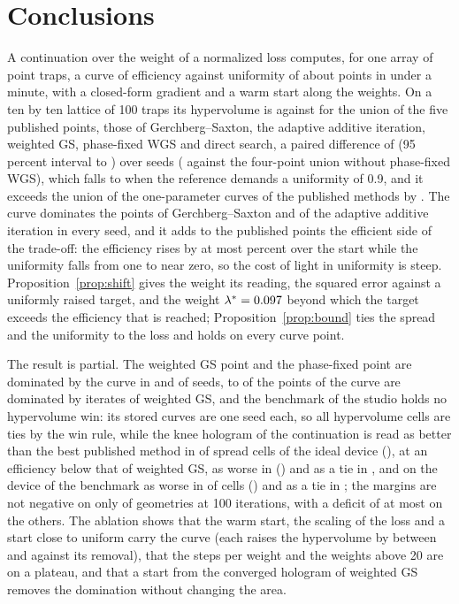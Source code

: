 \section{Conclusions}\label{sec:conclusions}

A continuation over the weight of a normalized loss computes, for one array of point traps, a curve of efficiency against uniformity of about \nLambda{} points in under a minute, with a closed-form gradient and a warm start along the weights. On a ten by ten lattice of 100 traps its hypervolume is \hvFront{} against \hvFivePub{} for the union of the five published points, those of Gerchberg--Saxton, the adaptive additive iteration, weighted GS, phase-fixed WGS and direct search, a paired difference of \hvFiveDiff{} (95 percent interval \hvFiveLo{} to \hvFiveHi) over \nSeeds{} seeds (\hvDiff{} against the four-point union without phase-fixed WGS), which falls to \hvRefFiveUNineDiff{} when the reference demands a uniformity of 0.9, and it exceeds the union of the one-parameter curves of the published methods by \rivUnionDiff{}.
The curve dominates the points of Gerchberg--Saxton and of the adaptive additive iteration in every seed, and it adds to the published points the efficient side of the trade-off: the efficiency rises by at most \eMaxRatioPct{} percent over the start while the uniformity falls from one to near zero, so the cost of light in uniformity is steep. Proposition~\ref{prop:shift} gives the weight its reading, the squared error against a uniformly raised target, and the weight $\lambda^\ast=0.097{}$ beyond which the target exceeds the efficiency that is reached;
Proposition~\ref{prop:bound} ties the spread and the uniformity to the loss and holds on every curve point.

The result is partial. The weighted GS point and the phase-fixed point are dominated by the curve in \domGSWSeeds{} and \domPFSeeds{} of \nSeeds{} seeds, \frontDomMin{} to \frontDomMax{} of the points of the curve are dominated by iterates of weighted GS, and the benchmark of the studio holds no hypervolume win: its stored curves are one seed each, so all \benchCells{} hypervolume cells are ties by the win rule, while the knee hologram of the continuation is read as better than the best published method in \spreadWins{} of \spreadCells{} spread cells of the ideal device (\spreadWinList{}), at an efficiency below that of weighted GS, as worse in \spreadLosses{} (\spreadLossList{}) and as a tie in \spreadTies{}, and on the device of the benchmark as worse in \spreadDevLosses{} of \spreadDevCells{} cells (\spreadDevLossList{}) and as a tie in \spreadDevTies{}; the margins are not negative on only \benchPassHundred{} of \benchNHundred{} geometries at 100 iterations, with a deficit of at most \benchWorstAbsHundred{} on the others. The ablation shows that the warm start, the scaling of the loss and a start close to uniform carry the curve (each raises the hypervolume by between \ablStartGsAbs{} and \ablRawAbs{} against its removal), that the steps per weight and the weights above 20 are on a plateau, and that a start from the converged hologram of weighted GS removes the domination without changing the area.

